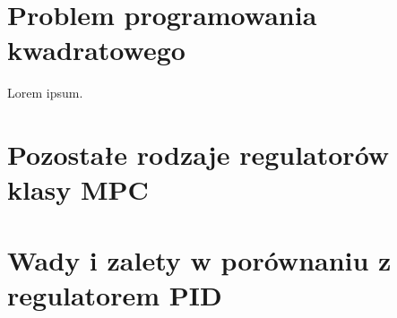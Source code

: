 \section{Problem programowania kwadratowego} \label{sec:qp}
Lorem ipsum.

\section{Pozostałe rodzaje regulatorów klasy MPC} \label{sec:other}

\section{Wady i zalety w porównaniu z regulatorem PID} \label{sec:comparison}
